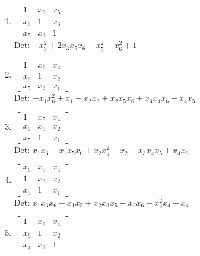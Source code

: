 \documentclass[12pt]{article}
\begin{document}
\begin{enumerate}
\begin{enumerate}
\begin{enumerate}
\item $\displaystyle \left[\begin{matrix}1 & x_{6} & x_{5}\\x_{6} & 1 & x_{3}\\x_{5} & x_{3} & 1\end{matrix}\right]$\\

Det: $- x_{3}^{2} + 2 x_{3} x_{5} x_{6} - x_{5}^{2} - x_{6}^{2} + 1$\\


\item $\displaystyle \left[\begin{matrix}1 & x_{6} & x_{4}\\x_{6} & 1 & x_{2}\\x_{5} & x_{3} & x_{1}\end{matrix}\right]$\\

Det: $- x_{1} x_{6}^{2} + x_{1} - x_{2} x_{3} + x_{2} x_{5} x_{6} + x_{3} x_{4} x_{6} - x_{4} x_{5}$\\


\item $\displaystyle \left[\begin{matrix}1 & x_{5} & x_{4}\\x_{6} & x_{3} & x_{2}\\x_{5} & 1 & x_{1}\end{matrix}\right]$\\

Det: $x_{1} x_{3} - x_{1} x_{5} x_{6} + x_{2} x_{5}^{2} - x_{2} - x_{3} x_{4} x_{5} + x_{4} x_{6}$\\


\item $\displaystyle \left[\begin{matrix}x_{6} & x_{5} & x_{4}\\1 & x_{3} & x_{2}\\x_{3} & 1 & x_{1}\end{matrix}\right]$\\

Det: $x_{1} x_{3} x_{6} - x_{1} x_{5} + x_{2} x_{3} x_{5} - x_{2} x_{6} - x_{3}^{2} x_{4} + x_{4}$\\


\item $\displaystyle \left[\begin{matrix}1 & x_{6} & x_{4}\\x_{6} & 1 & x_{2}\\x_{4} & x_{2} & 1\end{matrix}\right]$\\


\end{enumerate}
\end{enumerate}
\end{enumerate}
\end{document}
